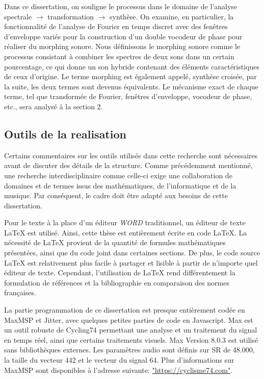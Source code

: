 Dans ce dissertation, on souligne le processus dans le domaine de l'analyse spectrale $\to$ transformation $\to$ synthèse. On examine, en particulier, la fonctionnalité de l'analyse de Fourier en temps discret avec des fenêtres d'enveloppe variés pour la construction d'un double vocodeur de phase pour réaliser du morphing sonore. Nous définissons le morphing sonore comme le processus consistant à combiner les spectres de deux sons dans un certain pourcentage, ce qui donne un son hybride contenant des éléments caractéristiques de ceux d'origine. Le terme morphing est également appelé, synthèse croisée, par la suite, les deux termes sont devenus équivalents. Le mécanisme exact de chaque terme, tel que transformée de Fourier, fenêtres d’enveloppe, vocodeur de phase, etc., sera analysé à la section 2.

\subsection{Outils de la realisation}

Certains commentaires sur les outils utilisés dans cette recherche sont nécessaires avant de discuter des détails de la structure. Comme précédemment mentionné, une recherche interdisciplinaire comme celle-ci exige une collaboration de domaines et de termes issus des mathématiques, de l'informatique et de la musique. Par conséquent, le cadre doit être adapté aux besoins de cette dissertation.

Pour le texte à la place d'un éditeur \textit{WORD} traditionnel, un éditeur de texte \LaTeX{} est utilisé. Ainsi, cette thèse est entièrement écrite en code \LaTeX{}. La nécessité de \LaTeX{} provient de la quantité de formules mathématiques présentées, ainsi que du code joint dans certaines sections. De plus, le code source \LaTeX{} est relativement plus facile à partager et lisible à partir de n’importe quel éditeur de texte. Cependant, l’utilisation de \LaTeX{} rend différentement la formulation de références et la bibliographie en comparaison des normes françaises.

La partie programmation de ce dissertation est presque entièrement codée en MaxMSP et Jitter, avec quelques petites parties de code en Javascript. Max est un outil robuste de Cycling74 permettant une analyse et un traitement du signal en temps réel, ainsi que certains traitements visuels. Max Version 8.0.3 est utilisé sans bibliothèques externes. Les paramètres audio sont définis sur SR de 48.000, la taille du vecteur 442 et le vecteur du signal 64. Plus d’informations sur MaxMSP sont disponibles à l’adresse suivante: \href{https://cycling74.com/products/max/}{"https://cyclisme74.com"}.

